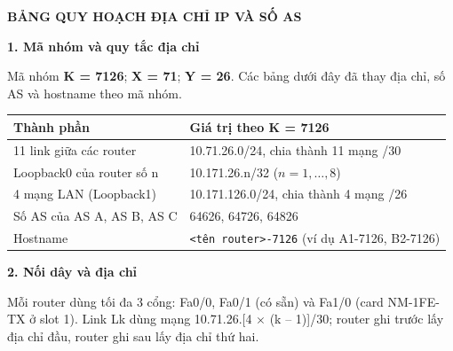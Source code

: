 

\clearpage
\begingroup

\setlength{\parindent}{0pt}
\setlength{\parskip}{0pt}
\renewcommand{\arraystretch}{1.3}
\setlength{\tabcolsep}{4pt}


\begin{center}
{\fontsize{15}{19}\selectfont\bfseries
BẢNG QUY HOẠCH ĐỊA CHỈ IP VÀ SỐ AS}
\end{center}

\vspace{0.35cm}

{\bfseries\large
1. Mã nhóm và quy tắc địa chỉ
}

\vspace{0.15cm}

Mã nhóm \textbf{K = 7126};
\textbf{X = 71}; \textbf{Y = 26}.
Các bảng dưới đây đã thay địa chỉ,
số AS và hostname theo mã nhóm.

\vspace{0.2cm}

\begin{table}[H]
\centering
\small
\begin{tabularx}{\textwidth}{|X|X|}
\hline
\textbf{Thành phần} & \textbf{Giá trị theo K = 7126} \\
\hline
11 link giữa các router &
10.71.26.0/24, chia thành 11 mạng /30 \\
\hline
Loopback0 của router số n &
10.171.26.n/32 ($n = 1,\ldots,8$) \\
\hline
4 mạng LAN (Loopback1) &
10.171.126.0/24, chia thành 4 mạng /26 \\
\hline
Số AS của AS A, AS B, AS C &
64626, 64726, 64826 \\
\hline
Hostname &
\texttt{<tên router>-7126}
(ví dụ A1-7126, B2-7126) \\
\hline
\end{tabularx}
\end{table}

\vspace{0.2cm}

{\bfseries\large
2. Nối dây và địa chỉ
}

\vspace{0.15cm}

Mỗi router dùng tối đa 3 cổng:
Fa0/0, Fa0/1 (có sẵn) và Fa1/0
(card NM-1FE-TX ở slot 1).
Link Lk dùng mạng
10.71.26.[4 $\times$ (k -- 1)]/30;
router ghi trước lấy địa chỉ đầu,
router ghi sau lấy địa chỉ thứ hai.

